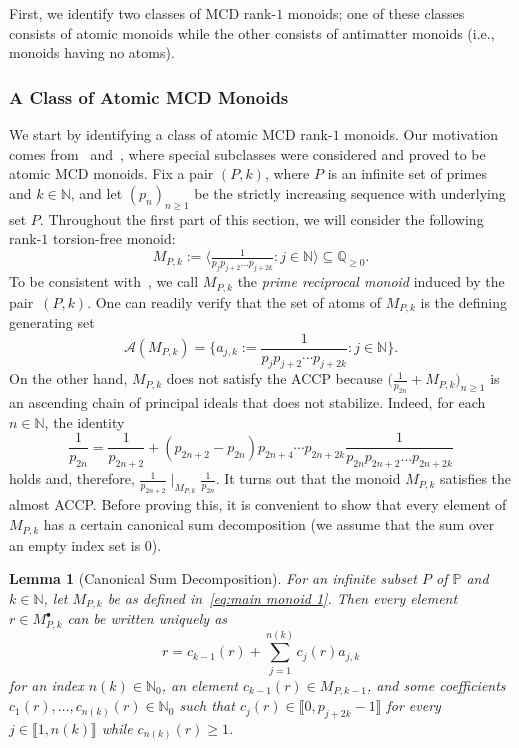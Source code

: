 \documentclass[10pt]{amsart}
\newtheorem{lemma}[theorem]{Lemma}
\theoremstyle{definition}
\theoremstyle{remark}
\numberwithin{equation}{section}
\newcommand{\nn}{\mathbb{N}}
\newcommand{\pp}{\mathbb{P}}
\newcommand{\qq}{\mathbb{Q}}
\providecommand\ldb{\llbracket}
\providecommand\rdb{\rrbracket}
\begin{document}
First, we identify two classes of MCD rank-$1$ monoids; one of these classes consists of atomic monoids while the other consists of antimatter monoids (i.e., monoids having no atoms).

\smallskip
\subsubsection{A Class of Atomic MCD Monoids}

We start by identifying a class of atomic MCD rank-$1$ monoids. Our motivation comes from~\cite{GL22a} and~\cite{LWZ24}, where special subclasses were considered and proved to be atomic MCD monoids. Fix a pair $(P,k)$, where $P$ is an infinite set of primes and $k \in \nn$, and let $(p_n)_{n \ge 1}$ be the strictly increasing sequence with underlying set $P$. Throughout the first part of this section, we will consider the following rank-$1$ torsion-free monoid:
\begin{equation} \label{eq:main monoid 1}
  M_{P,k} := \Big\langle \tfrac{1}{p_j p_{j+2} \dots p_{j+2k}} : j \in \nn \Big\rangle \subseteq \qq_{\ge 0}.
\end{equation}
To be consistent with~\cite{LWZ24}, we call $M_{P,k}$ the \emph{prime reciprocal monoid} induced by the pair~$(P,k)$. One can readily verify that the set of atoms of $M_{P,k}$ is the defining generating set
\begin{equation} \label{eq:atoms of M_P}
  \mathcal{A}(M_{P,k}) = \Big\{ a_{j,k} :=  \frac1{p_j p_{j+2} \cdots p_{j+2k}} : j \in \nn \Big\}.
\end{equation}
On the other hand, $M_{P,k}$ does not satisfy the ACCP because $\big( \frac1{p_{2n}} + M_{P,k} \big)_{n \ge 1}$ is an ascending chain of principal ideals that does not stabilize. Indeed, for each $n \in \nn$, the identity
\[
  \frac1{p_{2n}} = \frac1{p_{2n+2}} + (p_{2n+2} - p_{2n})p_{2n+4} \cdots p_{2n+2k} \frac1{p_{2n} p_{2n+2} \dots p_{2n + 2k}}
\]
holds and, therefore, $\frac1{p_{2n+2}} \mid_{M_{P,k}} \frac1{p_{2n}}$. It turns out that the monoid $M_{P,k}$ satisfies the almost ACCP. Before proving this, it is convenient to show that every element of $M_{P,k}$ has a certain canonical sum decomposition (we assume that the sum over an empty index set is $0$).

\begin{lemma}[Canonical Sum Decomposition] \label{lem:CSD 1}
  For an infinite subset $P$ of $\pp$ and $k \in \nn$, let $M_{P,k}$ be as defined in~\eqref{eq:main monoid 1}. Then every element $r \in M_{P,k}^\bullet$ can be written uniquely as
  \begin{equation}\label{eq:gen-decomp}
    r = c_{k-1}(r) + \sum_{j=1}^{n(k)} c_j(r) a_{j,k}
  \end{equation}
  for an index $n(k) \in \nn_0$, an element $c_{k-1}(r) \in M_{P,k-1}$, and some coefficients $c_1(r), \dots, c_{n(k)}(r) \in \nn_0$ such that $c_j(r) \in \ldb 0, p_{j+2k} - 1 \rdb$ for every $j \in \ldb 1,n(k) \rdb$ while $c_{n(k)}(r) \ge 1$.
\end{lemma}
\end{document}
